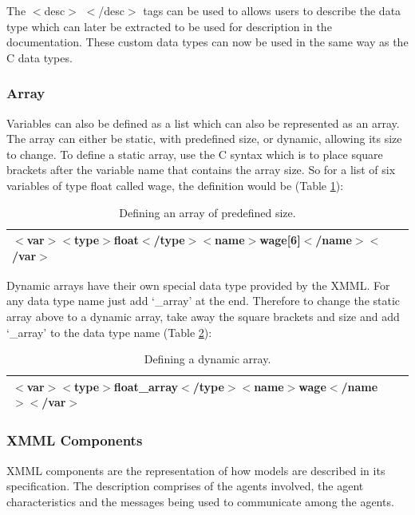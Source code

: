 \documentclass[a4paper,11pt]{article}
\begin{document}
The $<$desc$>$ $<$/desc$>$ tags can be used to allows users to
describe the data type which can later be extracted to be used for
description in the documentation. These custom data types can now be
used in the same way as the C data types.

\subsubsection{Array}
Variables can also be defined as a list which can also be
represented as an array. The array can either be static, with
predefined size, or dynamic, allowing its size to change. To define
a static array, use the C syntax which is to place square brackets
after the variable name that contains the array size. So for a list
of six variables of type float called wage, the definition would be
(Table \ref{tab:array1}):

\begin{table}[!htp]
\centering %
\begin{tabular}{|l|}
\hline
$<$var$><$type$>$float$<$/type$><$name$>$wage[6]$<$/name$><$/var$>$\\
\hline
\end{tabular}
\caption{Defining an array of predefined size.} \label{tab:array1}
\end{table}


Dynamic arrays have their own special data type provided by the
XMML. For any data type name just add `\_array' at the end.
Therefore to change the static array above to a dynamic array, take
away the square brackets and size and add `\_array' to the data type
name (Table \ref{tab:array2}):

\begin{table}[!htp]
\centering %
\begin{tabular}{|l|}
\hline $<$var$><$type$>$float\_array$<$/type$><$name$>$wage$<$/name$><$/var$>$\\
 \hline
\end{tabular}
\caption{Defining a dynamic array.} \label{tab:array2}
\end{table}


\subsubsection{XMML Components}
XMML components are the representation of how models are described
in its specification. The description comprises of the agents
involved, the agent characteristics and the messages being used to
communicate among the agents.
\end{document}
